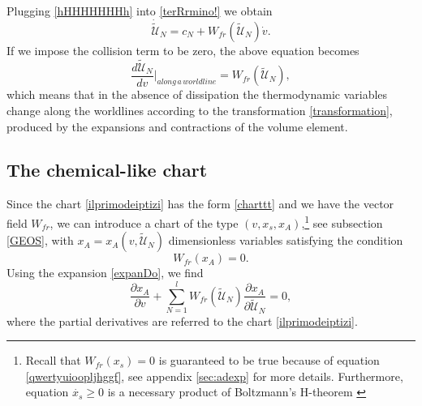 \documentclass[useAMS,usenatbib,prd,twocolumn,nofootinbib]{revtex4-1}
\begin{document}
Plugging \eqref{hHHHHHHHh} into \eqref{terRrmino!} we obtain
\begin{equation}\label{mammabusnelin}
\dot{\tilde{\mathcal{U}}}_{N} = c_N +W_{fr}(\tilde{\mathcal{U}}_N) \dot{v}.
\end{equation}
If we impose the collision term to be zero, the above equation becomes
\begin{equation}
\dfrac{d \tilde{\mathcal{U}}_N}{d v} \bigg|_{along \,a \, worldline} = W_{fr}(\tilde{\mathcal{U}}_N),
\end{equation}
which means that in the absence of dissipation the thermodynamic variables change along the worldlines according to the transformation \eqref{transformation}, produced by the expansions and contractions of the volume element.

\subsection{The chemical-like chart}

Since the chart \eqref{ilprimodeiptizi} has the form \eqref{charttt} and we have the vector field $W_{fr}$, we can introduce a chart of the type $(v,x_s,x_A)$,\footnote{Recall that $W_{fr}(x_s)=0$ is guaranteed to be true because of equation \eqref{qwertyuioopljhggf}, see appendix \ref{sec:adexp} for more details. Furthermore, equation $\dot{x_s} \geq 0$ is a necessary product of Boltzmann's H-theorem \citep{cercignani_book}} see subsection \ref{GEOS}, with $x_A=x_A(v,\tilde{\mathcal{U}}_N)$ dimensionless variables satisfying the condition
\begin{equation}
W_{fr}(x_A) = 0.
\end{equation}
Using the expansion \eqref{expanDo}, we find
\begin{equation}\label{annullamentototale}
\dfrac{\partial x_A}{\partial v} + \sum_{N=1}^l W_{fr}(\tilde{\mathcal{U}}_N) \dfrac{\partial x_A }{\partial \tilde{\mathcal{U}}_N}=0,
\end{equation}
where the partial derivatives are referred to the chart \eqref{ilprimodeiptizi}.
\end{document}
